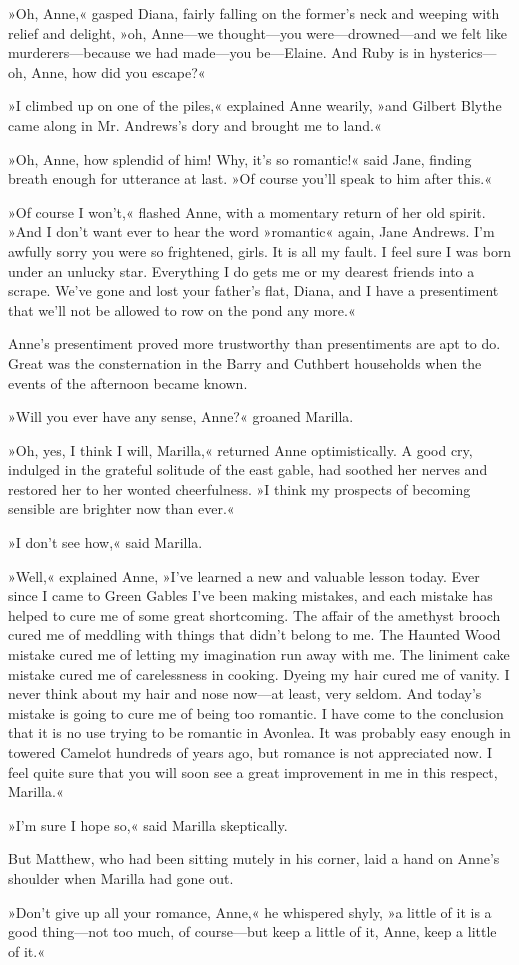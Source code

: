 »Oh, Anne,« gasped Diana, fairly falling on the former’s neck and weeping with relief and delight, »oh, Anne—we thought—you were—drowned—and we felt like murderers—because we had made—you be—Elaine. And Ruby is in hysterics—oh, Anne, how did you escape?«

»I climbed up on one of the piles,« explained Anne wearily, »and Gilbert Blythe came along in Mr. Andrews’s dory and brought me to land.«

»Oh, Anne, how splendid of him! Why, it’s so romantic!« said Jane, finding breath enough for utterance at last. »Of course you’ll speak to him after this.«

»Of course I won’t,« flashed Anne, with a momentary return of her old spirit. »And I don’t want ever to hear the word »romantic« again, Jane Andrews. I’m awfully sorry you were so frightened, girls. It is all my fault. I feel sure I was born under an unlucky star. Everything I do gets me or my dearest friends into a scrape. We’ve gone and lost your father’s flat, Diana, and I have a presentiment that we’ll not be allowed to row on the pond any more.«

Anne’s presentiment proved more trustworthy than presentiments are apt to do. Great was the consternation in the Barry and Cuthbert households when the events of the afternoon became known.

»Will you ever have any sense, Anne?« groaned Marilla.

»Oh, yes, I think I will, Marilla,« returned Anne optimistically. A good cry, indulged in the grateful solitude of the east gable, had soothed her nerves and restored her to her wonted cheerfulness. »I think my prospects of becoming sensible are brighter now than ever.«

»I don’t see how,« said Marilla.

»Well,« explained Anne, »I’ve learned a new and valuable lesson today. Ever since I came to Green Gables I’ve been making mistakes, and each mistake has helped to cure me of some great shortcoming. The affair of the amethyst brooch cured me of meddling with things that didn’t belong to me. The Haunted Wood mistake cured me of letting my imagination run away with me. The liniment cake mistake cured me of carelessness in cooking. Dyeing my hair cured me of vanity. I never think about my hair and nose now—at least, very seldom. And today’s mistake is going to cure me of being too romantic. I have come to the conclusion that it is no use trying to be romantic in Avonlea. It was probably easy enough in towered Camelot hundreds of years ago, but romance is not appreciated now. I feel quite sure that you will soon see a great improvement in me in this respect, Marilla.«

»I’m sure I hope so,« said Marilla skeptically.

But Matthew, who had been sitting mutely in his corner, laid a hand on Anne’s shoulder when Marilla had gone out.

»Don’t give up all your romance, Anne,« he whispered shyly, »a little of it is a good thing—not too much, of course—but keep a little of it, Anne, keep a little of it.«